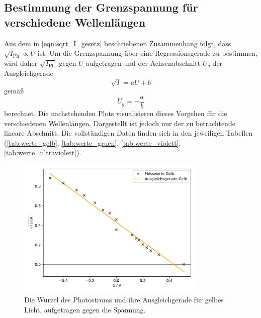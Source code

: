 \subsection{Bestimmung der Grenzspannung für verschiedene Wellenlängen}

Aus dem in \autoref{eqn:sqrt_I_gesetz} beschriebenen Zusammenhang folgt, dass $\sqrt{I_\text{Ph}} \propto U$ ist.
Um die Grenzspannung über eine Regressionsgerade zu bestimmen,
wird daher $\sqrt{I_\text{Ph}}$ gegen $U$ aufgetragen
und der Achsenabschnitt $U_g$ der Ausgleichgerade
\begin{equation*}
  \sqrt{I} = aU + b
\end{equation*}
gemäß
\begin{equation*}
    U_g = - \frac{a}{b}
\end{equation*}
berechnet.
Die nachstehenden Plots visualisieren dieses Vorgehen für die verschiedenen Wellenlängen.
Dargestellt ist jedoch nur der zu betrachtende lineare Abschnitt.
Die vollständigen Daten finden sich in den jeweiligen Tabellen
(\ref{tab:werte_gelb}, \ref{tab:werte_gruen}, \ref{tab:werte_violett}, \ref{tab:werte_ultraviolett}).

\begin{figure}[H]
    \centering
    \includegraphics[width=0.8\textwidth]{build/plot_sqrt_gelb.pdf}
    \caption{Die Wurzel des Photostroms und ihre Ausgleichgerade für gelbes Licht, aufgetragen gegen die Spannung.}
    \label{fig:plot_sqrt_gelb}
\end{figure}

